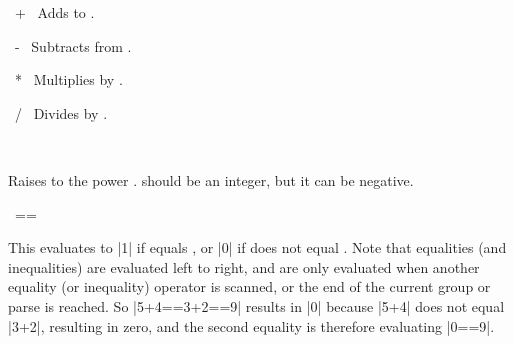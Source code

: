 \begin{math-operator}{\ +\ }
	Adds  to .
	
\begin{codeexample}[post=\tt\footnotesize\pgfmathresult]
\end{codeexample}
\end{math-operator}\begin{math-operator}{\ -\ }
	Subtracts  from  .
	
\begin{codeexample}[post=\tt\footnotesize\pgfmathresult]
\end{codeexample}
\end{math-operator}
\begin{math-operator}{\ *\ }
	Multiplies  by  .
	
\begin{codeexample}[post=\tt\footnotesize\pgfmathresult]
\end{codeexample}

\end{math-operator}
\begin{math-operator}{\ /\ }
	Divides  by  .
	
\begin{codeexample}[post=\tt\footnotesize\pgfmathresult]
\end{codeexample}

\end{math-operator}
\begin{math-operator}{\ {}\ } 

Raises  to the power .  should be an integer, but it can be negative.

\begin{codeexample}[post=\tt\footnotesize\pgfmathresult]
\end{codeexample}

\begin{codeexample}[post=\tt\footnotesize\pgfmathresult]
\end{codeexample}
\end{math-operator}

\begin{math-operator}{\ ==\ } 

	This evaluates to |1| if  equals , or |0| if 
	does not equal . 
	Note that equalities (and inequalities) are evaluated left to right, 
	and are only evaluated when another equality (or inequality) operator 
	is scanned, or the end of the current group or parse is reached. So 
	|5+4==3+2==9| results in |0| because |5+4| does not equal |3+2|, 
	resulting in zero, and the second equality is therefore evaluating 
	|0==9|.

\begin{codeexample}[post=\tt\footnotesize\pgfmathresult]
\end{codeexample}

\end{math-operator}



